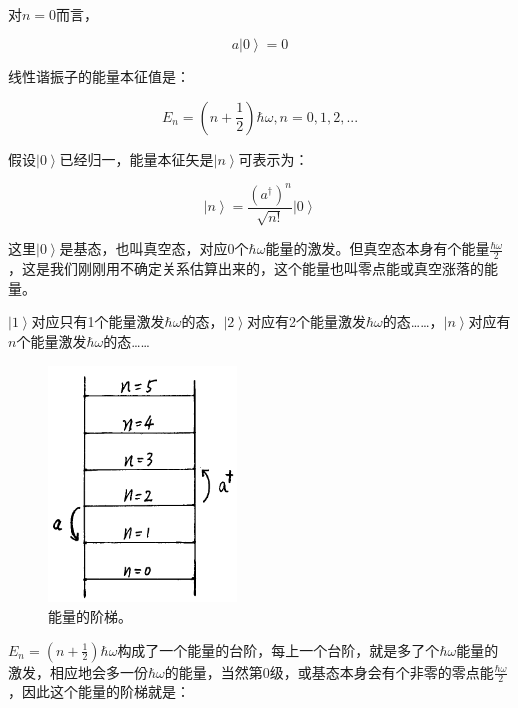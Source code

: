 ~

对$n = 0$而言，

\begin{equation}
a \left| 0 \right\rangle = 0
\end{equation}

线性谐振子的能量本征值是：

\begin{equation}
E_n = \left( n + \frac{1}{2} \right) \hbar \omega, n = 0, 1, 2, ...
\end{equation}

假设$\left| 0 \right\rangle$已经归一，能量本征矢是$\left| n \right\rangle$可表示为：

\begin{equation}
\left| n \right\rangle = \frac{ \left( a^\dagger \right)^n }{\sqrt{n !}} \left| 0 \right\rangle
\end{equation}

这里$\left| 0 \right\rangle$是基态，也叫真空态，对应0个$\hbar \omega$能量的激发。但真空态本身有个能量$\frac{\hbar \omega}{2}$，这是我们刚刚用不确定关系估算出来的，这个能量也叫零点能或真空涨落的能量。

$\left| 1 \right\rangle$对应只有1个能量激发$\hbar \omega$的态，$\left| 2 \right\rangle$对应有2个能量激发$\hbar \omega$的态……，$\left| n \right\rangle$对应有$n$个能量激发$\hbar \omega$的态……

\begin{figure}[htbp]
\begin{center}
\includegraphics[width=5cm]{LinearOscillator/ladder.png}
\caption{能量的阶梯。}
\label{default}
\end{center}
\end{figure}

$E_n = \left( n + \frac{1}{2}  \right) \hbar \omega$构成了一个能量的台阶，每上一个台阶，就是多了个$\hbar \omega$能量的激发，相应地会多一份$\hbar \omega$的能量，当然第0级，或基态本身会有个非零的零点能$\frac{\hbar \omega}{2}$，因此这个能量的阶梯就是：

